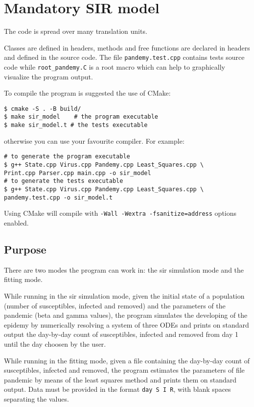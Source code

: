 \section{Mandatory SIR model}
\label{section : mandatory}

The code is spread over many translation units.

Classes are defined in headers, methods and free functions are declared in headers and defined in the source code. The file \verb!pandemy.test.cpp! contains tests source code while \verb!root_pandemy.C! is a root macro which can help to graphically visualize the program output.

To compile the program is suggested the use of CMake:
\begin{verbatim}
$ cmake -S . -B build/
$ make sir_model    # the program executable
$ make sir_model.t # the tests executable
\end{verbatim}
otherwise you can use your favourite compiler. For example:
\begin{verbatim}
# to generate the program executable
$ g++ State.cpp Virus.cpp Pandemy.cpp Least_Squares.cpp \
Print.cpp Parser.cpp main.cpp -o sir_model
# to generate the tests executable
$ g++ State.cpp Virus.cpp Pandemy.cpp Least_Squares.cpp \
pandemy.test.cpp -o sir_model.t
\end{verbatim}
Using CMake will compile with \verb!-Wall -Wextra -fsanitize=address! options enabled.

\subsection{Purpose}

There are two modes the program can work in: the sir simulation mode and the fitting mode.

While running in the sir simulation mode, given the initial state of a population (number of susceptibles, infected and removed) and the parameters of the pandemic (beta and gamma values), the program simulates the developing of the epidemy by numerically resolving a system of three ODEs and prints on standard output the day-by-day count of susceptibles, infected and removed from day 1 until the day choosen by the user.

While running in the fitting mode, given a file containing the day-by-day count of susceptibles, infected and removed, the program estimates the parameters of file pandemic by means of the least squares method \cite{Fornasini : Uncertainty} and prints them on standard output. Data must be provided in the format \verb!day S I R!, with blank spaces separating the values.

